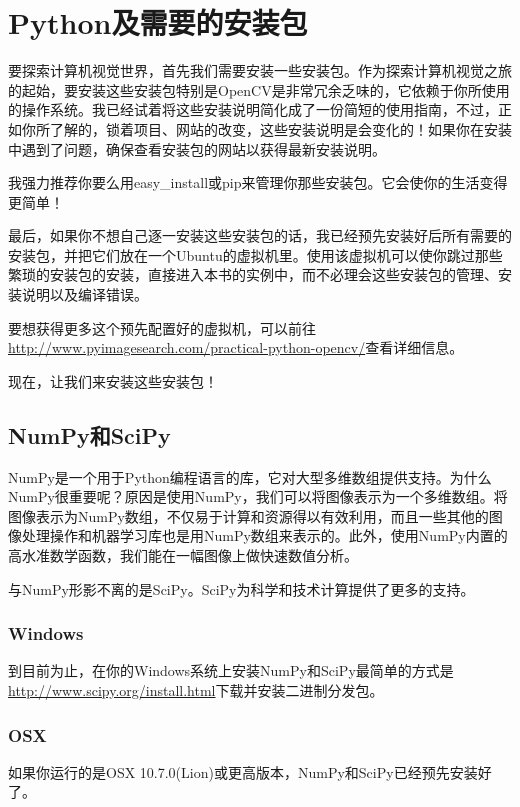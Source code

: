 \documentclass[color=cyan,mathpazo,titlestyle=hang]{elegantbook}
\begin{document}
\chapter{Python及需要的安装包}

要探索计算机视觉世界，首先我们需要安装一些安装包。作为探索计算机视觉之旅的起始，要安装这些安装包特别是OpenCV是非常冗余乏味的，它依赖于你所使用的操作系统。我已经试着将这些安装说明简化成了一份简短的使用指南，不过，正如你所了解的，锁着项目、网站的改变，这些安装说明是会变化的！如果你在安装中遇到了问题，确保查看安装包的网站以获得最新安装说明。

我强力推荐你要么用easy\_install或pip来管理你那些安装包。它会使你的生活变得更简单！

最后，如果你不想自己逐一安装这些安装包的话，我已经预先安装好后所有需要的安装包，并把它们放在一个Ubuntu的虚拟机里。使用该虚拟机可以使你跳过那些繁琐的安装包的安装，直接进入本书的实例中，而不必理会这些安装包的管理、安装说明以及编译错误。

要想获得更多这个预先配置好的虚拟机，可以前往\url{http://www.pyimagesearch.com/practical-python-opencv/}查看详细信息。

现在，让我们来安装这些安装包！

\section{NumPy和SciPy}

NumPy是一个用于Python编程语言的库，它对大型多维数组提供支持。为什么NumPy很重要呢？原因是使用NumPy，我们可以将图像表示为一个多维数组。将图像表示为NumPy数组，不仅易于计算和资源得以有效利用，而且一些其他的图像处理操作和机器学习库也是用NumPy数组来表示的。此外，使用NumPy内置的高水准数学函数，我们能在一幅图像上做快速数值分析。

与NumPy形影不离的是SciPy。SciPy为科学和技术计算提供了更多的支持。

\subsection{Windows}

到目前为止，在你的Windows系统上安装NumPy和SciPy最简单的方式是\url{http://www.scipy.org/install.html}下载并安装二进制分发包。

\subsection{OSX}

如果你运行的是OSX 10.7.0(Lion)或更高版本，NumPy和SciPy已经预先安装好了。
\end{document}
